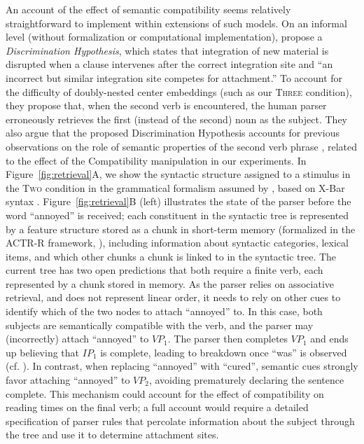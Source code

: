 An account of the effect of semantic compatibility seems relatively straightforward to implement within extensions of such models.
On an informal level (without formalization or computational implementation), \citet{Haussler2015AnIA} propose a \emph{Discrimination Hypothesis}, which states that integration of new material is disrupted when a clause intervenes after the correct integration site and ``an incorrect but similar integration site competes for attachment.''
To account for the difficulty of doubly-nested center embeddings (such as our \textsc{Three} condition), they propose that, when the second verb is encountered, the human parser erroneously retrieves the first (instead of the second) noun as the subject.
They also argue that the proposed Discrimination Hypothesis accounts for previous observations on the role of semantic properties of the second verb phrase \citep{gibson1999memory}, related to the effect of the Compatibility manipulation in our experiments. 
In Figure~\ref{fig:retrieval}A, we show the syntactic structure assigned to a stimulus in the \textsc{Two} condition in the grammatical formalism assumed by \citet{lewis2005activation}, based on X-Bar syntax \citep{Jackendoff1980XSA}.
Figure~\ref{fig:retrieval}B (left) illustrates the state of the parser before the word ``annoyed'' is received; each constituent in the syntactic tree is represented by a feature structure stored as a chunk in short-term memory (formalized in the ACTR-R framework, \citet{Anderson1990adaptive}), including information about syntactic categories, lexical items, and which other chunks a chunk is linked to in the syntactic tree.
The current tree has two open predictions that both require a finite verb, each represented by a chunk stored in memory.
As the parser relies on associative retrieval, and does not represent linear order, it needs to rely on other cues to identify which of the two nodes to attach ``annoyed'' to.
In this case, both subjects are semantically compatible with the verb, and the parser may (incorrectly) attach ``annoyed'' to $VP_1$. 
The parser then completes $VP_1$ and ends up believing that $IP_1$ is complete, leading to breakdown once ``was'' is observed (cf. \citet[][Section 6.3]{lewis2005activation}).
In contrast, when replacing ``annoyed'' with ``cured'', semantic cues strongly favor attaching ``annoyed'' to $VP_2$, avoiding prematurely declaring the sentence complete.
This mechanism could account for the effect of compatibility on reading times on the final verb; a full account would require a detailed specification of parser rules that percolate information about the subject through the tree and use it to determine attachment sites.



